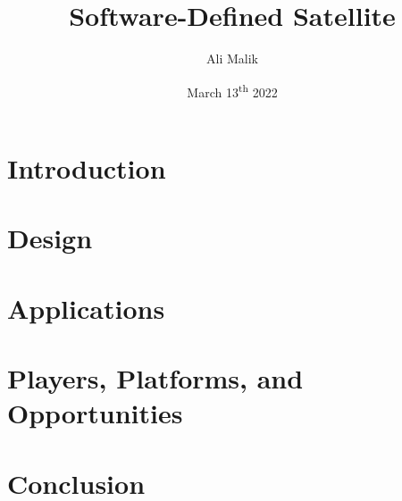 \documentclass[12pt, a4paper]{report}
\title{Software-Defined Satellite}
\author{Ali Malik}
\date{March 13\textsuperscript{th} 2022}
\begin{document}
\maketitle
\tableofcontents
\newpage
\listoffigures

\chapter{Introduction}


\chapter{Design}


\chapter{Applications}


\chapter{Players, Platforms, and Opportunities}


\chapter{Conclusion}




\end{document}
